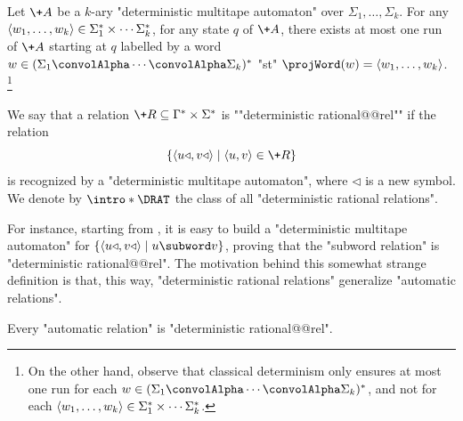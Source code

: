 \begin{claim}
	\label{claim:tool-deterministic-rational}
	Let $\+A$ be a $k$-ary "deterministic multitape automaton" over $\Sigma_1,\dotsc,\Sigma_k$.
	For any $\langle w_1,\dotsc,w_k\rangle \in \Sigma_1^* \times \cdots \Sigma_k^*$,
	for any state $q$ of $\+A$, there exists at most
	one run of $\+A$ starting at $q$ labelled by a word 
	$w \in (\Sigma_1\convolAlpha\cdots\convolAlpha\Sigma_k)^*$ "st" $\projWord(w) = \tup{w_1,\dotsc,w_k}$.%
	\footnote{On the other hand, observe that classical determinism only ensures
	at most one run for each $w \in (\Sigma_1\convolAlpha\cdots\convolAlpha\Sigma_k)^*$,
	and not for each $\langle w_1,\dotsc,w_k\rangle \in \Sigma_1^* \times \cdots \Sigma_k^*$.}
\end{claim}

We say that a relation $\+R \subseteq \Gamma^* \times \Sigma^*$ is ""deterministic rational@@rel""
if the relation
\[
	\{\tup{u\triangleleft, v\triangleleft} \mid \tup{u,v} \in \+R\}
\]
is recognized by a "deterministic multitape automaton", where $\triangleleft$ is a new symbol.
We denote by \AP$\intro*\DRAT$ the class of all "deterministic rational relations".

For instance, starting from , it is easy
to build a "deterministic multitape automaton" for
$\{\tup{u\triangleleft, v\triangleleft} \mid u \subword v\}$,
proving that the "subword relation" is "deterministic rational@@rel".
The motivation behind this somewhat strange definition is that, this way,
"deterministic rational relations" generalize "automatic relations".

\begin{proposition}
	\AP\label{prop:synchronous-implies-detrat}
	Every "automatic relation" is "deterministic rational@@rel".
\end{proposition}


